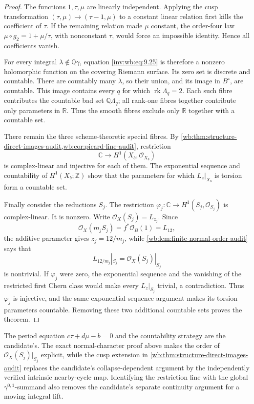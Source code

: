 \begin{proof}
The functions \(1,\tau,\mu\) are linearly independent.  Applying the cusp
transformation \((\tau,\mu)\mapsto(\tau-1,\mu)\) to a constant linear
relation first kills the coefficient of \(\tau\).  If the remaining
relation made \(\mu\) constant, the order-four law
\(\mu\circ g_2=1+\mu/\tau\), with nonconstant \(\tau\), would force an
impossible identity.  Hence all coefficients vanish.

For every integral \(\lambda\notin\mathbb Q\gamma\), equation \eqref{inv:wb:eq:9.25} is
therefore a nonzero holomorphic function on the covering Riemann surface.
Its zero set is discrete and countable.  There are countably many
\(\lambda\), so their union, and its image in \(B^\circ\), are countable.
This image contains every \(q\) for which
\(\operatorname{rk}\Lambda_q=2\).  Each such fibre contributes the
countable bad set \(\mathbb Q\Lambda_q\); all rank-one fibres together
contribute only parameters in \(\mathbb R\).  Thus the smooth fibres
exclude only \(\mathbb R\) together with a countable set.

There remain the three scheme-theoretic special fibres.  By
\cref{wb:thm:structure-direct-images-audit,wb:cor:picard-line-audit}, restriction
\[
 \mathbb C\longrightarrow H^1(X_b,\mathcal O_{X_b})
\]
is complex-linear and injective for each of them.  The exponential sequence
and countability of \(H^1(X_b;\mathbb Z)\) show that the parameters for
which \(L_z|_{X_b}\) is torsion form a countable set.

Finally consider the reductions \(S_j\).  The restriction
\(\varphi_j:\mathbb C\to H^1(S_j,\mathcal O_{S_j})\) is complex-linear.
It is nonzero.  Write \(\mathcal O_X(S_j)=L_{z_j}\).  Since
\[
 \mathcal O_X(m_jS_j)=f^*\mathcal O_B(1)=L_{12},
\]
the additive parameter gives \(z_j=12/m_j\), while
\cref{wb:lem:finite-normal-order-audit} says that
\[
 L_{12/m_j}|_{S_j}=\mathcal O_X(S_j)|_{S_j}
\]
is nontrivial.  If \(\varphi_j\) were zero, the exponential sequence and
the vanishing of the restricted first Chern class would make every
\(L_z|_{S_j}\) trivial, a contradiction.  Thus \(\varphi_j\) is
injective, and the same exponential-sequence argument makes its torsion
parameters countable.  Removing these two additional countable sets proves
the theorem.
\end{proof}

\begin{remark}\label{inv:wb:uniform-nontorsion-provenance}
The period equation \(c\tau+d\mu-b=0\) and the countability strategy are
the candidate's.  The exact normal-character proof above makes the order of
\(\mathcal O_X(S_j)|_{S_j}\) explicit, while the cusp extension in
\cref{wb:thm:structure-direct-images-audit} replaces the candidate's
collapse-dependent argument by the independently verified intrinsic
nearby-cycle map.  Identifying the restriction line with the global
\(\gamma^{0,1}\)-summand also removes the candidate's separate continuity
argument for a moving integral lift.
\end{remark}

